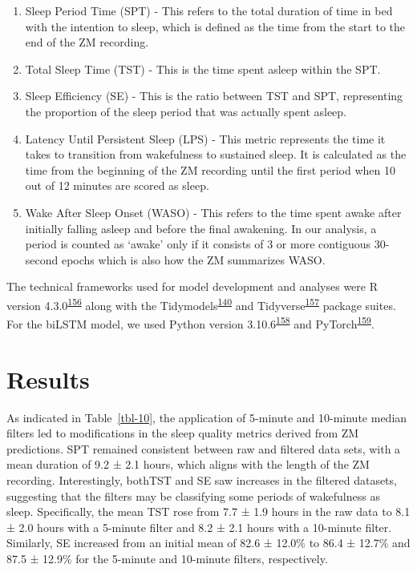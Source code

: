 \documentclass[
  10pt,
]{scrbook}
\providecommand{\tightlist}{%
  \setlength{\itemsep}{0pt}\setlength{\parskip}{0pt}}\usepackage{longtable,booktabs,array}
\begin{document}
\begin{enumerate}
\def\labelenumi{\arabic{enumi}.}
\tightlist
\item
  Sleep Period Time (SPT) - This refers to the total duration of time in
  bed with the intention to sleep, which is defined as the time from the
  start to the end of the ZM recording.
\item
  Total Sleep Time (TST) - This is the time spent asleep within the SPT.
\item
  Sleep Efficiency (SE) - This is the ratio between TST and SPT,
  representing the proportion of the sleep period that was actually
  spent asleep.
\item
  Latency Until Persistent Sleep (LPS) - This metric represents the time
  it takes to transition from wakefulness to sustained sleep. It is
  calculated as the time from the beginning of the ZM recording until
  the first period when 10 out of 12 minutes are scored as sleep.
\item
  Wake After Sleep Onset (WASO) - This refers to the time spent awake
  after initially falling asleep and before the final awakening. In our
  analysis, a period is counted as `awake' only if it consists of 3 or
  more contiguous 30-second epochs which is also how the ZM summarizes
  WASO.
\end{enumerate}

The technical frameworks used for model development and analyses were R
version
4.3.0\textsuperscript{\protect\hyperlink{ref-rcoreteam_2023}{156}} along
with the
Tidymodels\textsuperscript{\protect\hyperlink{ref-kuhn_tidymodels_2020}{140}}
and
Tidyverse\textsuperscript{\protect\hyperlink{ref-wickham_tidyverse_2019}{157}}
package suites. For the biLSTM model, we used Python version
3.10.6\textsuperscript{\protect\hyperlink{ref-vanrossum_python_2009}{158}}
and
PyTorch\textsuperscript{\protect\hyperlink{ref-paszke_pytorch_2019}{159}}.

\hypertarget{results-2}{%
\section{Results}\label{results-2}}

As indicated in Table~\ref{tbl-10}, the application of 5-minute and
10-minute median filters led to modifications in the sleep quality
metrics derived from ZM predictions. SPT remained consistent between raw
and filtered data sets, with a mean duration of 9.2 ± 2.1 hours, which
aligns with the length of the ZM recording. Interestingly, bothTST and
SE saw increases in the filtered datasets, suggesting that the filters
may be classifying some periods of wakefulness as sleep. Specifically,
the mean TST rose from 7.7 ± 1.9 hours in the raw data to 8.1 ± 2.0
hours with a 5-minute filter and 8.2 ± 2.1 hours with a 10-minute
filter. Similarly, SE increased from an initial mean of 82.6 ± 12.0\% to
86.4 ± 12.7\% and 87.5 ± 12.9\% for the 5-minute and 10-minute filters,
respectively.
\end{document}
